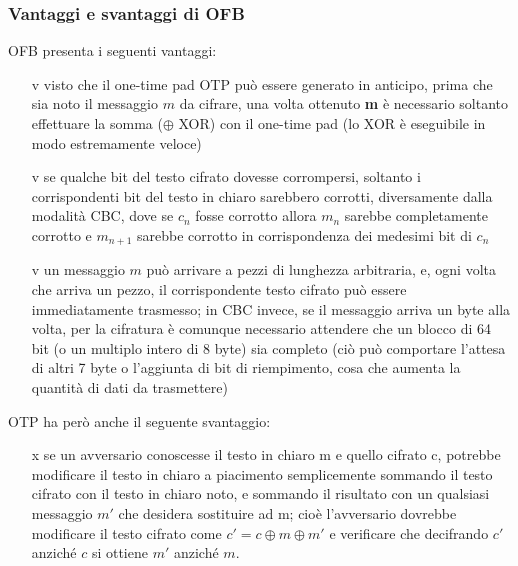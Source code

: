 \subsubsection{Vantaggi e svantaggi di OFB}
OFB presenta i seguenti vantaggi:
\begin{itemize}
\item[v] visto che il one-time pad OTP può essere generato in anticipo, prima che sia noto il messaggio $m$ da cifrare, una volta ottenuto \textbf{m} è necessario soltanto effettuare la somma ($\oplus$ XOR) con il one-time pad (lo XOR è eseguibile in modo estremamente veloce)
\item[v] se qualche bit del testo cifrato dovesse corrompersi, soltanto i corrispondenti bit del testo in chiaro sarebbero corrotti, diversamente dalla modalità CBC, dove se $c_{n}$ fosse corrotto allora $m_{n}$ sarebbe completamente corrotto e $m_{n+1}$ sarebbe corrotto in corrispondenza dei medesimi bit di $c_{n}$
\item[v] un messaggio $m$ può arrivare a pezzi di lunghezza arbitraria, e, ogni volta che arriva un pezzo, il corrispondente testo cifrato può essere immediatamente trasmesso; in CBC invece, se il messaggio arriva un byte alla volta, per la cifratura è comunque necessario attendere che un blocco di 64 bit (o un multiplo intero di 8 byte) sia completo (ciò può comportare l'attesa di altri 7 byte o l'aggiunta di bit di riempimento, cosa che aumenta la quantità di dati da trasmettere)
\end{itemize}
OTP ha però anche il seguente svantaggio:
\begin{itemize}
\item[x] se un avversario conoscesse il testo in chiaro m e quello cifrato c, potrebbe modificare il testo in
chiaro a piacimento semplicemente sommando il testo cifrato con il testo in chiaro noto, e sommando il risultato con un qualsiasi messaggio $m'$ che desidera sostituire ad m; cioè l'avversario dovrebbe modificare il testo cifrato come $c' = c \oplus m \oplus m'$ e verificare che decifrando $c'$ anziché $c$ si ottiene $m'$ anziché $m$.
\end{itemize}
